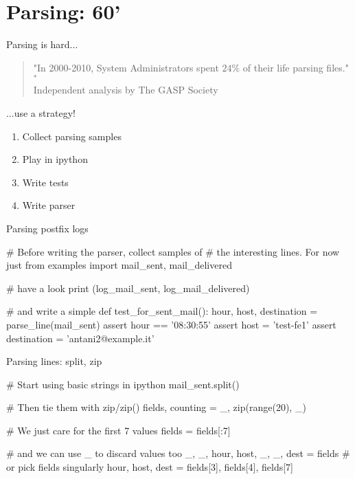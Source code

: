 \section{Parsing: 60'}



\begin{frame}[fragile]{Parsing is hard...}
\begin{verse}
"In 2000-2010, System Administrators spent $24\%$ of their life parsing files."$^{*}$\\
\hfill Independent analysis by The GASP Society
\end{verse}
\end{frame}


\begin{frame}[fragile]{...use a strategy!}
\begin{enumerate}
\item Collect parsing samples
\item Play in ipython
\item Write tests
\item Write parser
\end{enumerate}
\end{frame}



\begin{frame}[fragile]{Parsing postfix logs}
\begin{pythoncode}
# Before writing the parser, collect samples of
#  the interesting lines. For now just 
from examples import mail_sent, mail_delivered

# have a look 
print (log_mail_sent, log_mail_delivered)

# and write a simple 
def test_for_sent_mail():
    hour, host, destination = parse_line(mail_sent)
    assert hour == '08:30:55'
    assert host = 'test-fe1'
    assert destination = 'antani2@example.it'

\end{pythoncode}
\end{frame}


\begin{frame}[fragile]{Parsing lines: split, zip}
\begin{pythoncode}
# Start using basic strings in ipython
mail_sent.split()

# Then tie them with zip/zip() 
fields, counting  = _, zip(range(20), _)

# We just care for the first 7 values
fields = fields[:7]

# and we can use _ to discard values too
_, _, hour, host, _, _, dest = fields
# or pick fields singularly
hour, host, dest = fields[3], fields[4], fields[7]

\end{pythoncode}
\end{frame}


